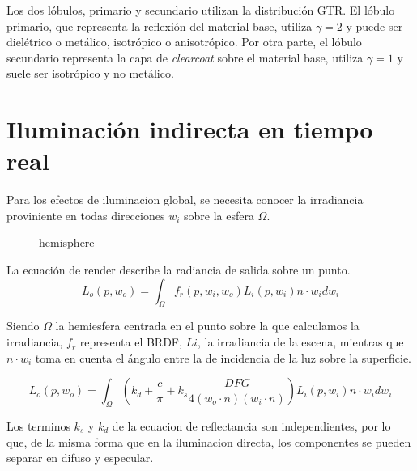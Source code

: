     
                Los dos l\'obulos, primario y secundario utilizan la distribuci\'on GTR. El l\'obulo primario,
                que representa la reflexi\'on del material base, utiliza $\gamma = 2$ y puede ser diel\'etrico o met\'alico,
                isotr\'opico o anisotr\'opico. Por otra parte, el l\'obulo secundario representa la capa de \textit{clearcoat}
                sobre el material base, utiliza $\gamma = 1$ y suele ser isotr\'opico y no met\'alico.
    
    
    
    \section{Iluminaci\'on indirecta en tiempo real}
    
    Para los efectos de iluminacion global, se necesita conocer la irradiancia proviniente en todas
    direcciones $w_i$ sobre la esfera $\Omega$.\\
    
    \begin{figure}[H]
        \vspace{0.5cm}
        \centering
        \caption{hemisphere}
      \end{figure}
      \singlespacing
    
    La ecuaci\'on de render describe la radiancia de salida sobre un punto.
    \begin{equation}
    L_o(p, w_o) = \int_{\Omega} f_r(p, w_i, w_o)L_i(p, w_i)n\cdot{w_i}dw_i
    \end{equation}
    \singlespacing
    
    Siendo $\Omega$ la hemiesfera centrada en el punto sobre la que calculamos la irradiancia,
    $f_r$ representa el BRDF, $Li$, la irradiancia de la escena, mientras que $n\cdot{w_i}$ toma en
    cuenta el \'angulo entre la de incidencia de la luz sobre la superficie.
    
    \begin{equation}
    L_o(p, w_o) = \int_{\Omega} (k_d + \frac{c}{\pi} + 
    k_s \frac{DFG}{4(w_o\cdot{n})(w_i\cdot{n})})L_i(p, w_i)n\cdot{w_i}dw_i
    \end{equation}
    \singlespacing
    
    Los terminos $k_s$ y $k_d$ de la ecuacion de reflectancia son independientes, por lo que, de la
    misma forma que en la iluminacion directa, los componentes se pueden separar en difuso y
    especular.
    
